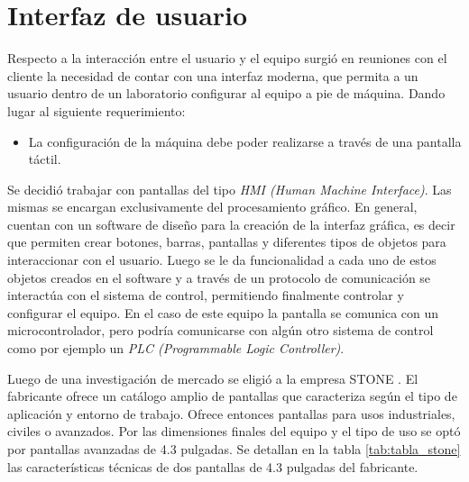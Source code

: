 \section{Interfaz de usuario}
\label{sec:interfaz_pantalla}

Respecto a la interacción entre el usuario y el equipo surgió en reuniones con el cliente la necesidad de contar con una interfaz moderna, que permita a un usuario dentro de un laboratorio configurar al equipo a pie de máquina. Dando lugar al siguiente requerimiento:
\begin{itemize}
\item La configuración de la máquina debe poder realizarse a través de una pantalla táctil.	
\end{itemize} 

Se decidió trabajar con pantallas del tipo \textit{HMI (Human Machine Interface)}. Las mismas se encargan exclusivamente del procesamiento gráfico. En general, cuentan con un software de diseño para la creación de la interfaz gráfica, es decir que permiten crear botones, barras, pantallas y diferentes tipos de objetos para interaccionar con el usuario. Luego se le da funcionalidad a cada uno de estos objetos creados en el software y a través de un protocolo de comunicación se interactúa con el sistema de control, permitiendo finalmente controlar y configurar el equipo. En el caso de este equipo la pantalla se comunica con un microcontrolador, pero  podría  comunicarse con algún otro sistema de control como por ejemplo un  \textit{PLC (Programmable Logic Controller)}.
 

Luego de una investigación de mercado se eligió a la empresa STONE \citep{web_stone}. El fabricante ofrece un catálogo amplio de pantallas que caracteriza según el tipo de aplicación y entorno de trabajo. Ofrece entonces pantallas para usos industriales, civiles o avanzados. Por las dimensiones finales del equipo y el tipo de uso se optó por pantallas avanzadas de 4.3 pulgadas. Se detallan en la tabla \ref{tab:tabla_stone} las características técnicas de dos pantallas de 4.3 pulgadas del fabricante.

